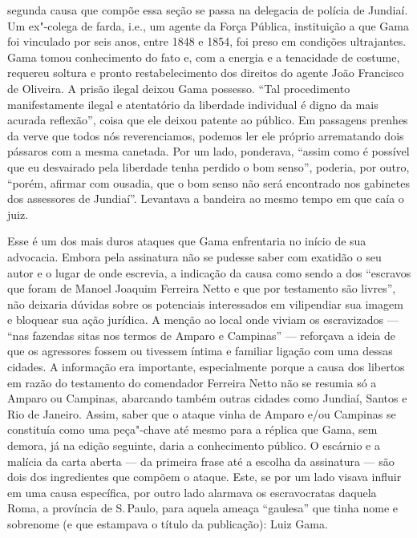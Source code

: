 {segunda causa que compõe essa seção se passa na delegacia de polícia de
Jundiaí. Um ex"-colega de farda, i.e., um agente da Força Pública,
instituição a que Gama foi vinculado por seis anos, entre 1848 e 1854,
foi preso em condições ultrajantes. Gama tomou conhecimento do
fato e, com a energia e a tenacidade de costume, requereu soltura e
pronto restabelecimento dos direitos do agente João Francisco de
Oliveira. A prisão ilegal deixou Gama possesso. ``Tal procedimento manifestamente
ilegal e atentatório da liberdade individual é digno da mais acurada
reflexão'', coisa que ele deixou patente ao público.
Em passagens prenhes da verve que todos nós reverenciamos, podemos ler
ele próprio arrematando dois pássaros com a mesma canetada. Por um lado,
ponderava, ``assim como é possível que eu desvairado pela liberdade tenha
perdido o bom senso'', poderia, por outro, ``porém, afirmar com ousadia,
que o bom senso não será encontrado nos gabinetes dos assessores de
Jundiaí''. Levantava a bandeira ao mesmo tempo em que caía o juiz.}
\@openrighttrue\makeatother \endgroup

\pagebreak
\mbox{}\vfill
\thispagestyle{empty}

{\small\noindent
Esse é um dos mais duros ataques que Gama enfrentaria no início de
sua advocacia. Embora pela assinatura não se pudesse saber com exatidão
o seu autor e o lugar de onde escrevia, a indicação da causa como sendo
a dos ``escravos que foram de Manoel Joaquim Ferreira Netto e que por
testamento são livres'', não deixaria dúvidas sobre os potenciais
interessados em vilipendiar sua imagem e bloquear sua ação jurídica. A
menção ao local onde viviam os escravizados --- ``nas fazendas sitas nos
termos de Amparo e Campinas'' --- reforçava a ideia de que os agressores
fossem ou tivessem íntima e familiar ligação com uma dessas cidades. A
informação era importante, especialmente porque a causa dos libertos em
razão do testamento do comendador Ferreira Netto não se resumia só a
Amparo ou Campinas, abarcando também outras cidades como Jundiaí, Santos
e Rio de Janeiro. Assim, saber que o ataque vinha de Amparo e/ou
Campinas se constituía como uma peça"-chave até mesmo para a réplica que
Gama, sem demora, já na edição seguinte, daria a conhecimento público. O
escárnio e a malícia da carta aberta --- da primeira frase até a escolha
da assinatura --- são dois dos ingredientes que compõem o ataque. Este,
se por um lado visava influir em uma causa específica,
por outro lado alarmava os escravocratas daquela Roma, a província de S.\,Paulo, para
aquela ameaça ``gaulesa'' que tinha nome e sobrenome (e que estampava o
título da publicação): Luiz Gama.}

